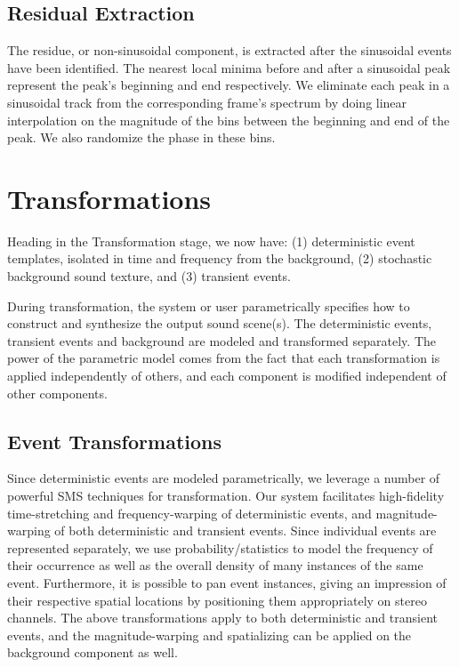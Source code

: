 \documentclass{acmsiggraph}               %
\begin{document}
\subsection{Residual Extraction}

The residue, or non-sinusoidal component, is extracted after the sinusoidal events have been identified. The nearest 
local minima before and after a sinusoidal peak represent the peak's beginning and end respectively. We eliminate 
each peak in a sinusoidal track from the corresponding frame's spectrum by doing linear interpolation on the 
magnitude of the bins between the beginning and end of the peak. We also randomize the phase in these bins.

\section{Transformations}

Heading in the Transformation stage, we now have: (1) deterministic event 
templates, isolated in time and frequency from the 
background, (2) stochastic background sound texture, and (3) transient events.

During transformation, the system or user parametrically specifies how to 
construct and synthesize the output sound scene(s).  The deterministic 
events, transient events and background are modeled and transformed 
separately. The power of the parametric model comes from the 
fact that each transformation is applied independently of others, and each component is 
modified independent of other components. 

\subsection{Event Transformations}

Since deterministic events are modeled parametrically, we leverage 
a number of powerful SMS techniques for transformation. Our system 
facilitates high-fidelity time-stretching and frequency-warping of 
deterministic events, and magnitude-warping of both deterministic and 
transient events. Since individual events are represented separately, we 
use probability/statistics to model the frequency of their occurrence as 
well as the overall density of many instances of the same event. 
Furthermore, it is possible to pan event instances, giving an impression 
of their respective spatial locations by positioning them appropriately 
on stereo channels. The above transformations apply to both 
deterministic and transient events, and the magnitude-warping and 
spatializing can be applied on the background component as well. 
\end{document}
